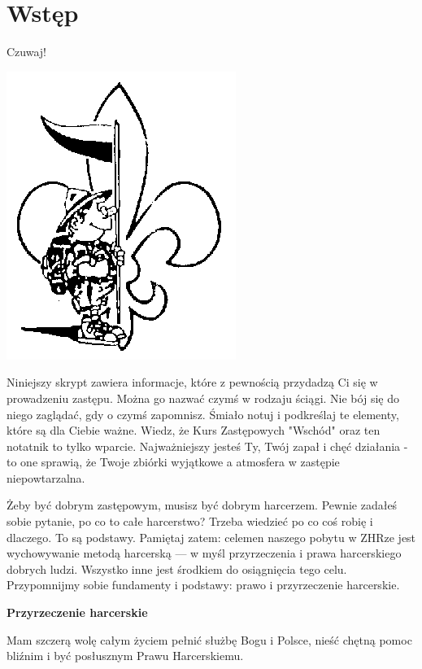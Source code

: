 \chapter{Wstęp}

Czuwaj!
\begin{floatingfigure}[l]{3cm}
  \includegraphics{grafiki/intro.png}
\end{floatingfigure}
Niniejszy skrypt zawiera informacje, które z pewnością przydadzą Ci się w prowadzeniu zastępu. Można go nazwać czymś w rodzaju ściągi. Nie bój się do niego zaglądać, gdy o czymś zapomnisz. Śmiało notuj i podkreślaj te elementy, które są dla Ciebie ważne. Wiedz, że Kurs Zastępowych "Wschód" oraz ten notatnik to tylko wparcie. Najważniejszy jesteś Ty, Twój zapał i chęć działania - to one sprawią, że Twoje zbiórki wyjątkowe a atmosfera w zastępie niepowtarzalna. 

Żeby być dobrym zastępowym, musisz być dobrym harcerzem. Pewnie zadałeś sobie pytanie, po co to całe harcerstwo? Trzeba wiedzieć po co coś robię i dlaczego. To są podstawy. Pamiętaj zatem: celemen naszego pobytu w ZHRze jest wychowywanie metodą harcerską --- w myśl przyrzeczenia i prawa harcerskiego dobrych ludzi. Wszystko inne jest  środkiem do osiągnięcia tego celu. Przypomnijmy sobie fundamenty i podstawy: prawo i przyrzeczenie harcerskie.



\textbf{Przyrzeczenie harcerskie}%

Mam szczerą wolę całym życiem pełnić służbę Bogu i Polsce, nieść chętną pomoc bliźnim i być posłusznym Prawu Harcerskiemu.


